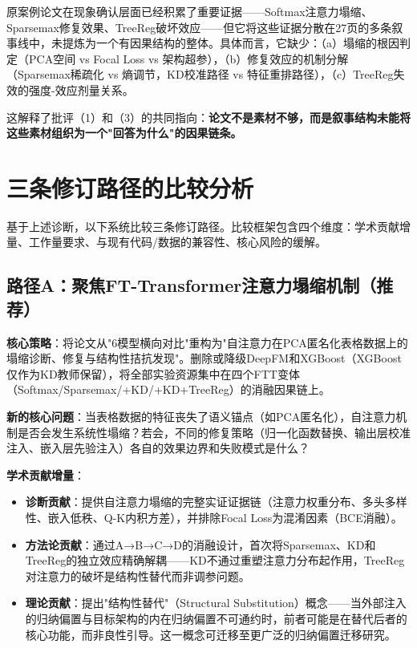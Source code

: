 \documentclass[UTF8,a4paper,12pt,fontset=fandol]{ctexart}
\begin{document}
原案例论文在现象确认层面已经积累了重要证据——Softmax注意力塌缩、Sparsemax修复效果、TreeReg破坏效应——但它将这些证据分散在27页的多条叙事线中，未提炼为一个有因果结构的整体。具体而言，它缺少：（a）塌缩的根因判定（PCA空间 vs Focal Loss vs 架构超参），（b）修复效应的机制分解（Sparsemax稀疏化 vs 熵调节，KD校准路径 vs 特征重排路径），（c）TreeReg失效的强度-效应剂量关系。

这解释了批评（1）和（3）的共同指向：\textbf{论文不是素材不够，而是叙事结构未能将这些素材组织为一个"回答为什么"的因果链条。}

\section{三条修订路径的比较分析}

基于上述诊断，以下系统比较三条修订路径。比较框架包含四个维度：学术贡献增量、工作量要求、与现有代码/数据的兼容性、核心风险的缓解。

\subsection{路径A：聚焦FT-Transformer注意力塌缩机制（推荐）}

\textbf{核心策略}：将论文从"6模型横向对比"重构为"自注意力在PCA匿名化表格数据上的塌缩诊断、修复与结构性拮抗发现"。删除或降级DeepFM和XGBoost（XGBoost仅作为KD教师保留），将全部实验资源集中在四个FTT变体（Softmax/Sparsemax/+KD/+KD+TreeReg）的消融因果链上。

\textbf{新的核心问题}：当表格数据的特征丧失了语义锚点（如PCA匿名化），自注意力机制是否会发生系统性塌缩？若会，不同的修复策略（归一化函数替换、输出层校准注入、嵌入层先验注入）各自的效果边界和失败模式是什么？

\textbf{学术贡献增量}：

\begin{itemize}
    \item \textbf{诊断贡献}：提供自注意力塌缩的完整实证证据链（注意力权重分布、多头多样性、嵌入低秩、Q-K内积方差），并排除Focal Loss为混淆因素（BCE消融）。
    \item \textbf{方法论贡献}：通过A→B→C→D的消融设计，首次将Sparsemax、KD和TreeReg的独立效应精确解耦——KD不通过重塑注意力分布起作用，TreeReg对注意力的破坏是结构性替代而非调参问题。
    \item \textbf{理论贡献}：提出"结构性替代"（Structural Substitution）概念——当外部注入的归纳偏置与目标架构的内在归纳偏置不可通约时，前者可能是在替代后者的核心功能，而非良性引导。这一概念可迁移至更广泛的归纳偏置迁移研究。
\end{itemize}
\end{document}
